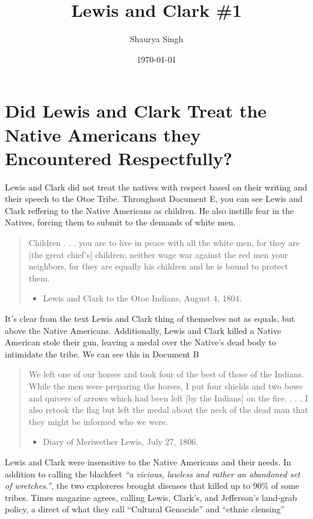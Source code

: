 \documentclass{scrartcl}
\author{Shaurya Singh}
\date{\today}
\title{Lewis and Clark \#1}
\begin{document}
\maketitle

\section{Did Lewis and Clark Treat the Native Americans they Encountered Respectfully?}
\label{sec:org9c29bec}

Lewis and Clark did not treat the natives with respect based on their writing
and their speech to the Otoe Tribe. Throughout Document E, you can see Lewis and
Clark reffering to the Native Americans as children. He also instills fear in
the Natives, forcing them to submit to the demands of white men.
\begin{quote}
Children . . . you are to live in peace with all the white men, for they are [the
great chief’s] children; neither wage war against the red men your
neighbors, for they are equally his children and he is bound to protect them.

\begin{itemize}
\item Lewis and Clark to the Otoe Indians, August 4, 1804.
\end{itemize}
\end{quote}

It's clear from the text Lewis and Clark thing of themselves not as equals, but
above the Native Americans. Additionally, Lewis and Clark killed a Native
American stole their gun, leaving a medal over the Native's dead body to
intimidate the tribe. We can see this in Document B
\begin{quote}
We left one of our horses and took four of the best of those of the Indians.
While the men were preparing the horses, I put four shields and two bows
and quivers of arrows which had been left [by the Indians] on the fire. . . . I
also retook the flag but left the medal about the neck of the dead man that
they might be informed who we were.

\begin{itemize}
\item Diary of Meriwether Lewis, July 27, 1806.
\end{itemize}
\end{quote}

Lewis and Clark were insensitive to the Native Americans and their needs. In addition
to calling the blackfeet \emph{“a vicious, lawless and rather an abandoned set of wretches.”}, the two exploreres brought diseases that killed up to 90\% of some
tribes. Times magazine agrees, calling Lewis, Clark's, and Jefferson's land-grab
policy, a direct of what they call ``Cultural Genocide'' and ``ethnic clensing''
\end{document}
